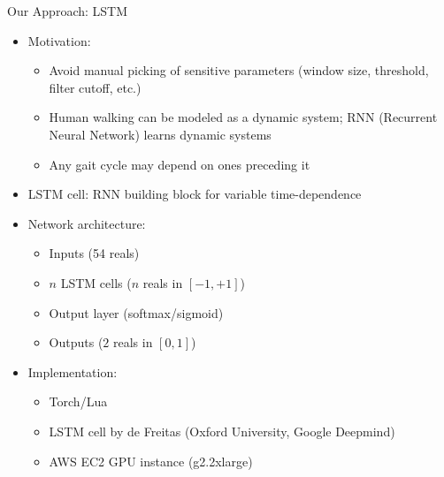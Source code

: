 \documentclass{beamer}
\begin{document}
\begin{frame}{Our Approach: LSTM}
    \begin{itemize}
        \item
            Motivation:
            \begin{itemize}
            \item
                Avoid manual picking of sensitive parameters (window size, threshold, filter cutoff, etc.)
            \item
                Human walking can be modeled as a dynamic system; RNN (Recurrent Neural Network) learns dynamic systems
            \item
                Any gait cycle may depend on ones preceding it
            \end{itemize}
        \item
            LSTM cell: RNN building block for variable time-dependence
        \item
            Network architecture:
            \begin{itemize}
                \item Inputs (54 reals)
                \item $n$ LSTM cells ($n$ reals in $[-1, +1]$)
                \item Output layer (softmax/sigmoid)
                \item Outputs ($2$ reals in $[0, 1]$)
            \end{itemize}
        \item
            Implementation:
            \begin{itemize}
                \item
                    Torch/Lua
                \item
                    LSTM cell by
                    de Freitas (Oxford University, Google Deepmind)
                \item
                    AWS EC2 GPU instance (g2.2xlarge)
            \end{itemize}
    \end{itemize}
\end{frame}
\end{document}
